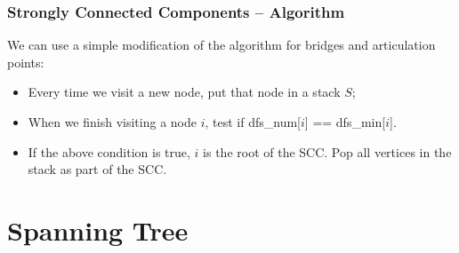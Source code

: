 \documentclass{beamer}
\begin{document}
\begin{frame}
  \frametitle{Strongly Connected Components -- Algorithm} 

  We can use a simple modification of the algorithm for bridges and
  articulation points:

  \begin{itemize}
    \item Every time we visit a new node, put that node in a stack $S$;
    \item When we finish visiting a node $i$, test if dfs\_num[$i$] == dfs\_min[$i$].
    \item If the above condition is true, $i$ is the root of the
      SCC. Pop all vertices in the stack as part of the SCC.
  \end{itemize}
\end{frame}


\section{Spanning Tree}
\end{document}
